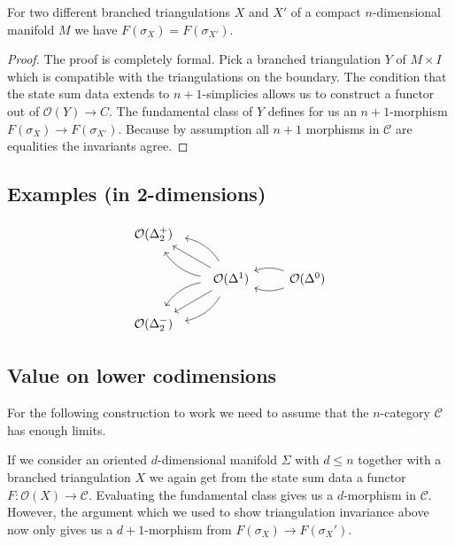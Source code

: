 \begin{theorem}
For two different branched triangulations $X$ and $X'$ of a compact $n$-dimensional manifold $M$ we have $F(\sigma_X)=F(\sigma_{X'})$.
\end{theorem}
\begin{proof}
The proof is completely formal.
Pick a branched triangulation $Y$ of $M\times I$ which is compatible with the triangulations on the boundary.
The condition that the state sum data extends to $n+1$-simplicies allows us to construct a functor out of $\mathcal{O}(Y)\longrightarrow C $.
The fundamental class of $Y$ defines for us an $n+1$-morphism $F(\sigma_X)\longrightarrow F(\sigma_{X'})$.
Because by assumption all $n+1$ morphisms in $\mathcal{C}$ are equalities the invariants agree.

\end{proof}
\begin{remark}
\end{remark}
\subsection{Examples (in 2-dimensions)}

\[
\begin{tikzcd}
\mathcal{O}(\Delta^+_2)    & &
\\
& \mathcal{O}(\Delta^1) \ar[lu, bend right = 25, shorten <=0.2cm, shorten >=0.2cm] \ar[lu, bend left = 25, shorten <=0.2cm, shorten >=0.2cm] \ar[lu] \ar[ld, bend right = 25, shorten <=0.2cm, shorten >=0.2cm] \ar[ld, bend left = 25, shorten <=0.2cm, shorten >=0.2cm] \ar[ld] & \mathcal{O}(\Delta^0) \ar[l, bend left=20] \ar[l, bend right=20]
\\
\mathcal{O}(\Delta^-_2) & &
\end{tikzcd}
\]

\subsection{Value on lower codimensions}
For the following construction to work we need to assume that the $n$-category $\mathcal{C}$ has enough limits.

If we consider an oriented $d$-dimensional manifold $\Sigma$ with $d\leq n$ together with a  branched triangulation $X$ we again get from the state sum data a functor $F\colon \mathcal{O}(X)\longrightarrow \mathcal{C}$.
Evaluating the fundamental class gives us a $d$-morphism in
$\mathcal{C}$.
However, the argument which we used to show triangulation invariance above now only gives us a $d+1$-morphism from $F(\sigma_X)\longrightarrow  F(\sigma_X')$.

